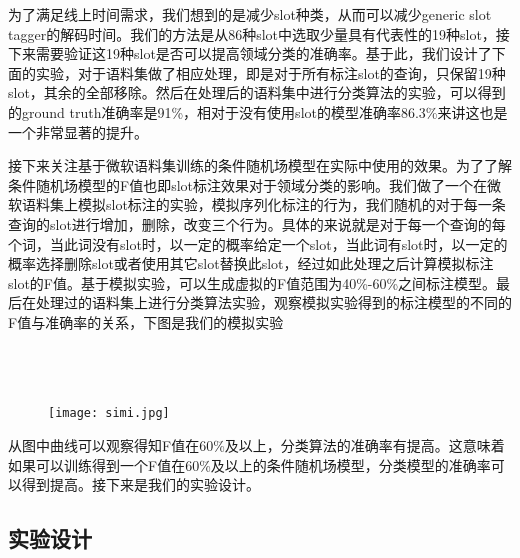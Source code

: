 \documentclass[master]{njuthesis}
\begin{document}
    为了满足线上时间需求，我们想到的是减少slot种类，从而可以减少generic slot tagger的解码时间。我们的方法是从86种slot中选取少量具有代表性的19种slot，接下来需要验证这19种slot是否可以提高领域分类的准确率。基于此，我们设计了下面的实验，对于语料集做了相应处理，即是对于所有标注slot的查询，只保留19种slot，其余的全部移除。然后在处理后的语料集中进行分类算法的实验，可以得到的ground truth准确率是91\%，相对于没有使用slot的模型准确率86.3\%来讲这也是一个非常显著的提升。
    
    接下来关注基于微软语料集训练的条件随机场模型在实际中使用的效果。为了了解条件随机场模型的F值也即slot标注效果对于领域分类的影响。我们做了一个在微软语料集上模拟slot标注的实验，模拟序列化标注的行为，我们随机的对于每一条查询的slot进行增加，删除，改变三个行为。具体的来说就是对于每一个查询的每个词，当此词没有slot时，以一定的概率给定一个slot，当此词有slot时，以一定的概率选择删除slot或者使用其它slot替换此slot，经过如此处理之后计算模拟标注slot的F值。基于模拟实验，可以生成虚拟的F值范围为40\%-60\%之间标注模型。最后在处理过的语料集上进行分类算法实验，观察模拟实验得到的标注模型的不同的F值与准确率的关系，下图是我们的模拟实验\\
\\
\\
\\
    
    \begin{figure}[htbp]
      \centering
      \texttt{[image: simi.jpg]}
      \caption{}\label{fig:test1}
    \end{figure}

    
    从图中曲线可以观察得知F值在60\%及以上，分类算法的准确率有提高。这意味着如果可以训练得到一个F值在60\%及以上的条件随机场模型，分类模型的准确率可以得到提高。接下来是我们的实验设计。

\subsection{实验设计}
\end{document}
